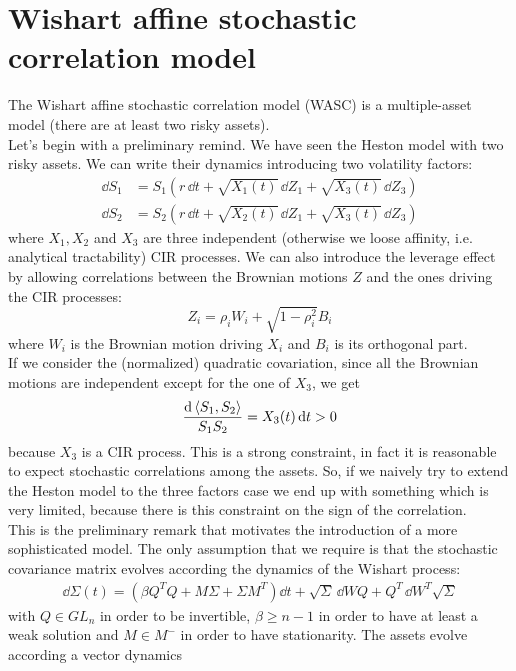 \section{Wishart affine stochastic correlation model}
The Wishart affine stochastic correlation model (WASC) is a multiple-asset model (there are at least two risky assets). \\
Let's begin with a preliminary remind. We have seen the Heston model with two risky assets. We can write their dynamics introducing two volatility factors:
\begin{align*}
    \dd S_1 &= S_1(r\,\dd t + \sqrt{X_1(t)}\,\dd Z_1 + \sqrt{X_3(t)}\,\dd Z_3) \\
    \dd S_2 &= S_2(r\,\dd t + \sqrt{X_2(t)}\,\dd Z_1 + \sqrt{X_3(t)}\,\dd Z_3)
\end{align*}
where $X_1,X_2$ and $X_3$ are three independent (otherwise we loose affinity, i.e. analytical tractability) CIR processes. We can also introduce the leverage effect by allowing correlations between the Brownian motions $Z$ and the ones driving the CIR processes:
\begin{equation*}
    Z_i = \rho_iW_i + \sqrt{1-\rho_i^2}B_i
\end{equation*}
where $W_i$ is the Brownian motion driving $X_i$ and $B_i$ is its orthogonal part. \\
If we consider the (normalized) quadratic covariation, since all the Brownian motions are independent except for the one of $X_3$, we get
\begin{align*}
    \frac{\dd\expval{S_1,S_2}}{S_1S_2} = X_3(t) \,\dd t > 0
\end{align*}
because $X_3$ is a CIR process. This is a strong constraint, in fact it is reasonable to expect stochastic correlations among the assets. So, if we naively try to extend the Heston model to the three factors case we end up with something which is very limited, because there is this constraint on the sign of the correlation.\\
This is the preliminary remark that motivates the introduction of a more sophisticated model. The only assumption that we require is that the stochastic covariance matrix evolves according the dynamics of the Wishart process:
\begin{align}
    \dd\Sigma(t) = (\beta Q^TQ + M\Sigma + \Sigma M^T)\dd t + \sqrt{\Sigma}\,\dd WQ + Q^T\,\dd W^T\sqrt{\Sigma}
\end{align}
with $Q\in GL_n$ in order to be invertible, $\beta\ge n-1$ in order to have at least a weak solution and $M\in M^-$ in order to have stationarity. The assets evolve according a vector dynamics
